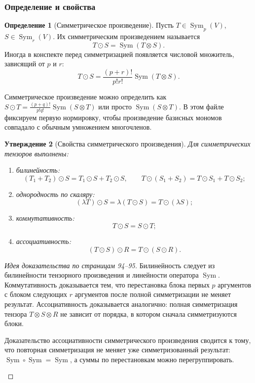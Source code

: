 \documentclass[12pt,a4paper]{article}
\theoremstyle{definition}
\newtheorem{definition}{Определение}[section]
\theoremstyle{plain}
\newtheorem{proposition}[definition]{Утверждение}
\theoremstyle{remark}
\newenvironment{knowledgefix}{\begin{clarifybox}}{\end{clarifybox}}
\newcommand{\Sym}{\operatorname{Sym}}
\begin{document}
\subsubsection*{Определение и свойства}

\begin{definition}[Симметрическое произведение]
Пусть $T\in\Sym_p(V)$, $S\in\Sym_r(V)$. Их симметрическим произведением называется
\[
    T\odot S=\Sym(T\otimes S).
\]
Иногда в конспекте перед симметризацией появляется числовой множитель, зависящий от $p$ и $r$:
\[
    T\odot S=\frac{(p+r)!}{p!r!}\Sym(T\otimes S).
\]
\begin{knowledgefix}
Симметрическое произведение можно определить как \(S\odot T=\frac{(p+q)!}{p!q!}\Sym(S\otimes T)\) или просто \(\Sym(S\otimes T)\). В этом файле фиксируем первую нормировку, чтобы произведение базисных мономов совпадало с обычным умножением многочленов.
\end{knowledgefix}
\end{definition}

\begin{proposition}[Свойства симметрического произведения]
Для симметрических тензоров выполнены:
\begin{enumerate}[label=\arabic*)]
    \item билинейность:
    \[
        (T_1+T_2)\odot S=T_1\odot S+T_2\odot S,
        \qquad
        T\odot(S_1+S_2)=T\odot S_1+T\odot S_2;
    \]
    \item однородность по скаляру:
    \[
        (\lambda T)\odot S=\lambda(T\odot S)=T\odot(\lambda S);
    \]
    \item коммутативность:
    \[
        T\odot S=S\odot T;
    \]
    \item ассоциативность:
    \[
        (T\odot S)\odot R=T\odot(S\odot R).
    \]
\end{enumerate}
\end{proposition}

\begin{proof}[Идея доказательства по страницам 94--95]
Билинейность следует из билинейности тензорного произведения и линейности оператора $\Sym$.
Коммутативность доказывается тем, что перестановка блока первых $p$ аргументов с блоком следующих $r$ аргументов после полной симметризации не меняет результат.
Ассоциативность доказывается аналогично: полная симметризация тензора $T\otimes S\otimes R$ не зависит от порядка, в котором сначала симметризуются блоки.
\begin{knowledgefix}
Доказательство ассоциативности симметрического произведения сводится к тому, что повторная симметризация не меняет уже симметризованный результат: \(\Sym\circ\Sym=\Sym\), а суммы по перестановкам можно перегруппировать.
\end{knowledgefix}
\end{proof}
\end{document}
